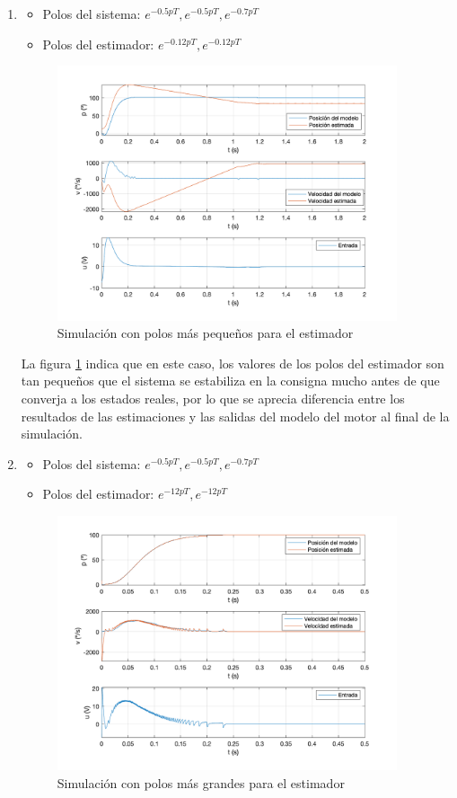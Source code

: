 \documentclass[a4paper, 12pt]{article}
\begin{document}
\begin{enumerate}
	\item 
		\begin{itemize}
			\item Polos del sistema: $e^{-0.5pT}, e^{-0.5pT}, e^{-0.7pT}$
			\item Polos del estimador: $e^{-0.12pT}, e^{-0.12pT}$
		\end{itemize}
	
	
	\begin{figure}[H]
		\centering
		\includegraphics*[height = 7.5cm]{figs/p5/l011}
		\caption{Simulación con polos más pequeños para el estimador} \label{slo2}
	\end{figure}
	La figura \ref{slo2} indica que en este caso, los valores de los polos del estimador son tan pequeños que el sistema se estabiliza en la consigna mucho antes de que converja a los estados reales, por lo que se aprecia diferencia entre los resultados de las estimaciones y las salidas del modelo del motor al final de la simulación.
	\item 
		\begin{itemize}
			\item Polos del sistema: $e^{-0.5pT}, e^{-0.5pT}, e^{-0.7pT}$
			\item Polos del estimador: $e^{-12pT}, e^{-12pT}$
		\end{itemize}
	
		\begin{figure}[H]
			\centering
			\includegraphics*[height = 7.5cm]{figs/p5/l11}
		
			\caption{Simulación con polos más grandes para el estimador} 
		\end{figure}
			
	
	\end{enumerate}
\end{document}
